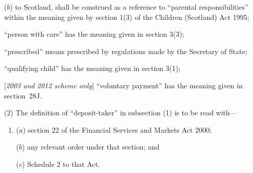 \documentclass[12pt,a4paper]{article}
\begin{document}
\begin{enumerate}
\begin{enumerate}
($b$) to Scotland, shall be construed as a reference to “parental responsibilities” within the meaning given by section 1(3) of the Children (Scotland) Act 1995;
\end{enumerate}


    “person with care” has the meaning given in section 3(3);

    “prescribed” means prescribed by regulations made by the Secretary of State;

    “qualifying child” has the meaning given in section 3(1);

[\emph{2003 and 2012 scheme only}] “voluntary payment” has the meaning given in section~28J.
\end{enumerate}

(2) The definition of “deposit-taker” in subsection (1) is to be read with—
\begin{enumerate}\item[]
($a$) section 22 of the Financial Services and Markets Act 2000;

($b$) any relevant order under that section; and

($c$) Schedule 2 to that Act.
\end{enumerate}
\end{document}
